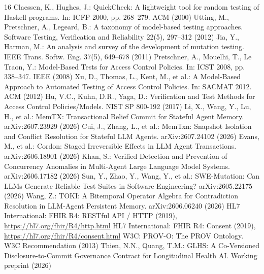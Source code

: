 \documentclass[runningheads]{llncs}
\begin{document}
\begin{thebibliography}{16}
 Claessen, K., Hughes, J.: QuickCheck: A lightweight tool for random testing of Haskell programs. In: ICFP 2000, pp. 268--279. ACM (2000)
 Utting, M., Pretschner, A., Legeard, B.: A taxonomy of model-based testing approaches. Software Testing, Verification and Reliability 22(5), 297--312 (2012)
 Jia, Y., Harman, M.: An analysis and survey of the development of mutation testing. IEEE Trans. Softw. Eng. 37(5), 649--678 (2011)
 Pretschner, A., Mouelhi, T., Le Traon, Y.: Model-Based Tests for Access Control Policies. In: ICST 2008, pp. 338--347. IEEE (2008)
 Xu, D., Thomas, L., Kent, M., et al.: A Model-Based Approach to Automated Testing of Access Control Policies. In: SACMAT 2012. ACM (2012)
 Hu, V.C., Kuhn, D.R., Yaga, D.: Verification and Test Methods for Access Control Policies/Models. NIST SP 800-192 (2017)
 Li, X., Wang, Y., Lu, H., et al.: MemTX: Transactional Belief Commit for Stateful Agent Memory. arXiv:2607.23929 (2026)
 Cui, J., Zhang, L., et al.: MemTxn: Snapshot Isolation and Conflict Resolution for Stateful LLM Agents. arXiv:2607.24102 (2026)
 Evans, M., et al.: Cordon: Staged Irreversible Effects in LLM Agent Transactions. arXiv:2606.18901 (2026)
 Khan, S.: Verified Detection and Prevention of Concurrency Anomalies in Multi-Agent Large Language Model Systems. arXiv:2606.17182 (2026)
 Sun, Y., Zhao, Y., Wang, Y., et al.: SWE-Mutation: Can LLMs Generate Reliable Test Suites in Software Engineering? arXiv:2605.22175 (2026)
 Wang, Z.: TOKI: A Bitemporal Operator Algebra for Contradiction Resolution in LLM-Agent Persistent Memory. arXiv:2606.06240 (2026)
 HL7 International: FHIR R4: RESTful API / HTTP (2019), \url{https://hl7.org/fhir/R4/http.html}
 HL7 International: FHIR R4: Consent (2019), \url{https://hl7.org/fhir/R4/consent.html}
 W3C: PROV-O: The PROV Ontology. W3C Recommendation (2013)
 Thien, N.N., Quang, T.M.: GLHS: A Co-Versioned Disclosure-to-Commit Governance Contract for Longitudinal Health AI. Working preprint (2026)
\end{thebibliography}
\end{document}
